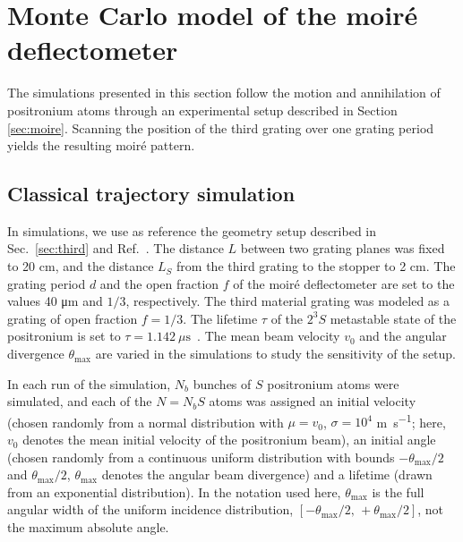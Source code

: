 \documentclass[12pt]{report}
\begin{document}
\section{Monte Carlo model of the moir\'e deflectometer}

The simulations presented in this section follow the motion and annihilation of positronium atoms through an experimental setup described in Section \ref{sec:moire}. Scanning the position of the third grating over one grating period yields the resulting moir\'e pattern. 

\subsection{Classical trajectory simulation}

In simulations, we use as reference the geometry setup described in Sec.~\ref{sec:third} and Ref.~\cite{Mariazzi_Caravita_Doser_Nebbia_Brusa_2020}. The distance $L$ between two grating planes was fixed to 20 cm, and the distance $L_S$ from the third grating to the stopper to 2 cm. The grating period $d$ and the open fraction $f$ of the moir\'e deflectometer are set to the values 40 \si{\micro\metre} and $1/3$, respectively. 
The third material grating was modeled as a grating of open fraction $f=1/3$. The lifetime $\tau$ of the $2^3S$ metastable state of the positronium is set to $\tau=1.142~\mu\mathrm{s}$~\cite{Aghion_Amsler_Antonello_Belov_Bonomi_Brusa_Caccia_Camper_Caravita_Castelli_etal._2018}. The mean beam velocity $v_0$ and the angular divergence $\theta_{\max}$ are varied in the simulations to study the sensitivity of the setup.

In each run of the simulation, \(N_b\) bunches of \(S\) positronium atoms were simulated, and each of the \(N=N_bS\) atoms was assigned an initial velocity (chosen randomly from a normal distribution with \(\mu=v_0\), \(\sigma=10^4\) \si{\metre\per\second}; here, \(v_0\) denotes the mean initial velocity of the positronium beam), an initial angle (chosen randomly from a continuous uniform distribution with bounds \(-\theta_{\max}/2\) and \(\theta_{\max}/2\), \(\theta_{\max}\) denotes the angular beam divergence) and a lifetime (drawn from an exponential distribution). In the notation used here, $\theta_{\max}$ is the full angular width of the uniform incidence distribution, $[-\theta_{\max}/2,\,+\theta_{\max}/2]$, not the maximum absolute angle.
\end{document}
